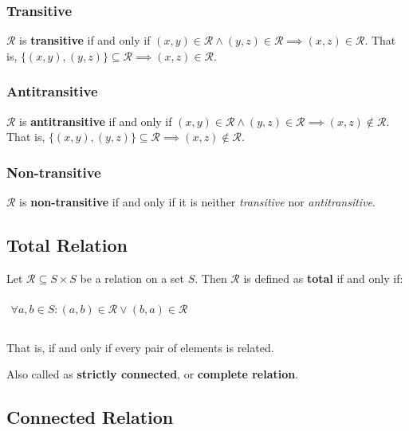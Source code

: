 \subsubsection{Transitive}

$\mathcal{R}$ is \textbf{transitive} if and only if
$(x, y) \in \mathcal{R} \land (y, z) \in \mathcal{R} \implies (x, z)
\in \mathcal{R}$. That is,
$\{(x, y), (y, z)\} \subseteq \mathcal{R} \implies (x, z) \in
\mathcal{R}$.

\subsubsection{Antitransitive}

$\mathcal{R}$ is \textbf{antitransitive} if and only if
$ (x, y) \in \mathcal{R} \land (y, z) \in \mathcal{R} \implies (x, z)
\notin \mathcal{R}$. That is,
$ \{ (x, y), (y, z) \} \subseteq \mathcal{R} \implies (x, z) \notin
\mathcal{R} $.

\subsubsection{Non-transitive}

$\mathcal{R}$ is \textbf{non-transitive} if and only if it is neither
\textit{transitive} nor \textit{antitransitive}.


\subsection{Total Relation}
\label{sec:total-relation}

Let $\mathcal{R} \subseteq S \times S$ be a relation on a set
$S$. Then $\mathcal{R}$ is defined as \textbf{total} if and only if:

\begin{math}
  \begin{array}{c}
    \\
    \forall a, b \in S : (a, b) \in \mathcal{R} \lor (b, a) \in \mathcal{R} \\
    \\
  \end{array}
\end{math}

That is, if and only if every pair of elements is related.

Also called as \textbf{strictly connected}, or \textbf{complete
  relation}.

\subsection{Connected Relation}
\label{sec:connected-relation}

